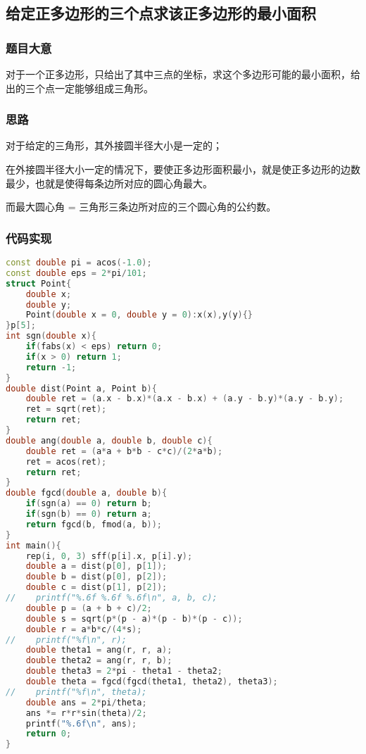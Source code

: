 \subsection{给定正多边形的三个点求该正多边形的最小面积}

\subsubsection{题目大意}


对于一个正多边形，只给出了其中三点的坐标，求这个多边形可能的最小面积，给出的三个点一定能够组成三角形。

\subsubsection{思路}

对于给定的三角形，其外接圆半径大小是一定的；

在外接圆半径大小一定的情况下，要使正多边形面积最小，就是使正多边形的边数最少，也就是使得每条边所对应的圆心角最大。

而最大圆心角 = 三角形三条边所对应的三个圆心角的公约数。

\subsubsection{代码实现}

\begin{lstlisting}[language=C++]
const double pi = acos(-1.0);
const double eps = 2*pi/101;
struct Point{
    double x;
    double y;
    Point(double x = 0, double y = 0):x(x),y(y){}
}p[5];
int sgn(double x){
    if(fabs(x) < eps) return 0;
    if(x > 0) return 1;
    return -1;
}
double dist(Point a, Point b){
    double ret = (a.x - b.x)*(a.x - b.x) + (a.y - b.y)*(a.y - b.y);
    ret = sqrt(ret);
    return ret;
}
double ang(double a, double b, double c){
    double ret = (a*a + b*b - c*c)/(2*a*b);
    ret = acos(ret);
    return ret;
}
double fgcd(double a, double b){
    if(sgn(a) == 0) return b;
    if(sgn(b) == 0) return a;
    return fgcd(b, fmod(a, b));
}
int main(){
    rep(i, 0, 3) sff(p[i].x, p[i].y);
    double a = dist(p[0], p[1]);
    double b = dist(p[0], p[2]);
    double c = dist(p[1], p[2]);
//    printf("%.6f %.6f %.6f\n", a, b, c);
    double p = (a + b + c)/2;
    double s = sqrt(p*(p - a)*(p - b)*(p - c));
    double r = a*b*c/(4*s);
//    printf("%f\n", r);
    double theta1 = ang(r, r, a);
    double theta2 = ang(r, r, b);
    double theta3 = 2*pi - theta1 - theta2;
    double theta = fgcd(fgcd(theta1, theta2), theta3);
//    printf("%f\n", theta);
    double ans = 2*pi/theta;
    ans *= r*r*sin(theta)/2;
    printf("%.6f\n", ans);
    return 0;
}
\end{lstlisting}

